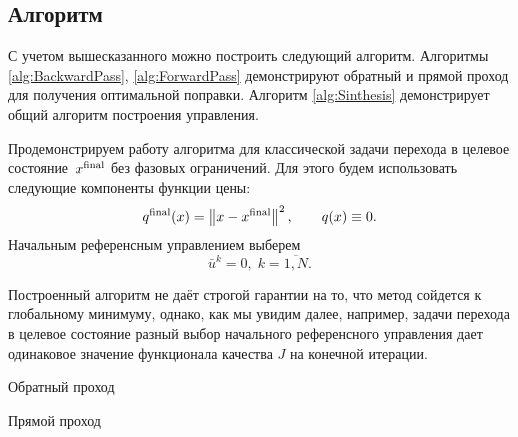 \documentclass[../../doc.tex]{subfiles}
\begin{document}
    \subsection{Алгоритм}
    С учетом вышесказанного можно построить следующий алгоритм.
    Алгоритмы \ref{alg:BackwardPass}, \ref{alg:ForwardPass} демонстрируют обратный и прямой проход для получения оптимальной поправки.
    Алгоритм \ref{alg:Sinthesis} демонстрирует общий алгоритм построения управления.

    Продемонстрируем работу алгоритма для классической задачи перехода в целевое состояние~$x^{\textnormal{final}}$ без фазовых ограничений.
    Для этого будем использовать следующие компоненты функции цены:
    \begin{equation}\label{eq:ilqr-algo:cost}
        q^{\textnormal{final}}(x) = \left\|x - x^{\textnormal{final}}\right\|^2,
        \qquad
        q(x) \equiv 0.
    \end{equation}
    Начальным референсным управлением выберем
    \begin{equation}\label{eq:ilqr-algo:ref-control}
        \bar u^k = 0,\; k = \overline{1, N}.
    \end{equation}

    Построенный алгоритм не даёт строгой гарантии на то, что метод сойдется к глобальному минимуму,
    однако, как мы увидим далее, например, задачи перехода в целевое состояние
    разный выбор начального референсного управления дает одинаковое значение функционала
    качества $J$ на конечной итерации.

    \clearpage
    \begin{rusalgorithm}\caption{Обратный проход}\label{alg:BackwardPass}
        \DontPrintSemicolon
    \end{rusalgorithm}
    \begin{rusalgorithm}\caption{Прямой проход}\label{alg:ForwardPass}
        \DontPrintSemicolon
    \end{rusalgorithm}
    
\end{document}
